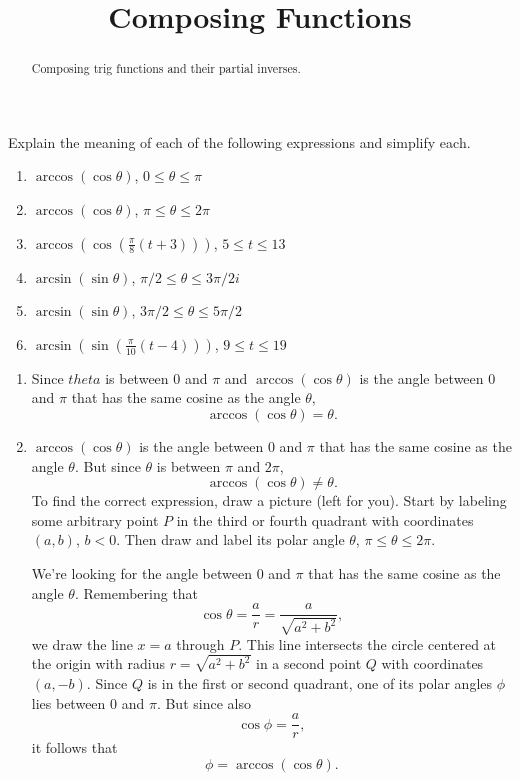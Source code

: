 \documentclass{ximera}
\title{Composing Functions}
\begin{document}
\begin{abstract}
Composing trig functions and their partial inverses.
\end{abstract}
\maketitle

\begin{question} \label{Qd3r90}
Explain the meaning of each of the following expressions and simplify each.

\begin{enumerate}
\item $\arccos(\cos\theta)$, $0\leq \theta \leq \pi$

\item $\arccos(\cos\theta)$, $\pi\leq \theta \leq 2\pi$

\item $\arccos\left(\cos\left( \frac{\pi}{8}\left( t+3 \right) \right)\right)$, $5 \leq t \leq 13$

\item $\arcsin(\sin\theta)$, $\pi/2\leq \theta \leq 3\pi/2i$

\item $\arcsin(\sin\theta)$, $3\pi/2\leq \theta \leq 5\pi/2$

\item $\arcsin\left(\sin\left( \frac{\pi}{10}\left( t-4 \right) \right)\right)$, $9 \leq t \leq 19$

\end{enumerate}

\begin{explanation}
\begin{enumerate}
\item Since $theta$ is between $0$ and $\pi$ and $\arccos(\cos\theta)$ is the angle between $0$ and $\pi$ that has the same cosine as the angle $\theta$, 
\[
   \arccos(\cos\theta) = \theta .
\]


\item $\arccos(\cos\theta)$ is the angle between $0$ and $\pi$ that has the same cosine as the angle $\theta$. But since $\theta$ is between $\pi$ and $2\pi$,
\[
   \arccos(\cos\theta) \neq \theta .
\]
To find the correct expression, draw a picture (left for you). Start by labeling some arbitrary point $P$ in the third or fourth quadrant with coordinates $(a,b)$, $b< 0$. Then draw and label its polar angle $\theta$, $\pi \leq \theta \leq 2\pi$. 

We're looking for the angle between $0$ and $\pi$ that has the same cosine as the angle $\theta$. Remembering that 
\[
  \cos\theta = \frac{a}{r} = \frac{a}{\sqrt{a^2 + b^2}},
\]
we draw the line $x=a$ through $P$. This line intersects the circle centered at the origin with radius $r=\sqrt{a^2+b^2}$ in a second point $Q$ with coordinates $(a,-b)$. Since $Q$ is in the first or second quadrant, one of its polar angles $\phi$ lies between $0$ and $\pi$. But since also
\[
 \cos\phi = \frac{a}{r},
\]
it follows that
\[
 \phi = \arccos(\cos\theta).
\] 


\end{enumerate}
\end{explanation}
\end{question}
\end{document}
